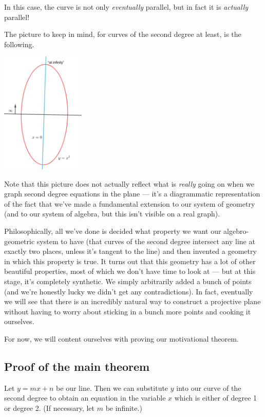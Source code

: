 \documentclass[a4paper,leqno,10pt]{article}
\theoremstyle{exercise}
\theoremstyle{plain}
\theoremstyle{definition}
\theoremstyle{remark}
\begin{document}
In this case, the curve is not only \emph{eventually} parallel, but in fact it is \emph{actually} parallel!

The picture to keep in mind, for curves of the second degree at least, is the following.

\begin{center}
  \includegraphics[width=0.3\textwidth]{infiniteparabola}
\end{center}

Note that this picture does not actually reflect what is \emph{really} going on when we graph second degree
equations in the plane --- it's a diagrammatic representation of the fact that we've made a fundamental extension
to our system of geometry (and to our system of algebra, but this isn't visible on a real graph).

Philosophically, all we've done is decided what property we want our algebro-geometric system to have (that
curves of the second degree intersect any line at exactly two places, unless it's tangent to the line) and then
invented a geometry in which this property is true. It turns out that this geometry has a lot of other beautiful
properties, most of which we don't have time to look at --- but at this stage, it's completely synthetic. We simply
arbitrarily added a bunch of points (and we're honestly lucky we didn't get any contradictions). In fact, eventually
we will see that there is an incredibly natural way to construct a projective plane without having to worry about
sticking in a bunch more points and cooking it ourselves.

For now, we will content ourselves with proving our motivational theorem.

\subsection{Proof of the main theorem}

Let $ y = mx + n $ be our line. Then we can substitute $ y $ into our curve of the second degree to obtain an equation
in the variable $ x $ which is either of degree 1 or degree 2. (If necessary, let $ m $ be infinite.)
\end{document}
